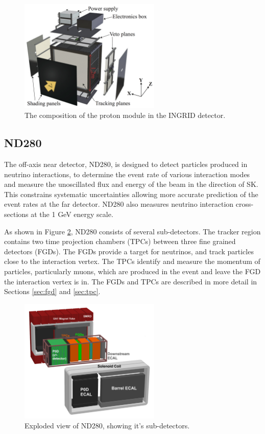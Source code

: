 \begin{figure}
\centering
\includegraphics*[width=0.6\textwidth,clip]{figs/protonmodule}
\caption{The composition of the proton module in the INGRID detector.} \label{protonmodule}
\end{figure}

\subsection{ND280}\label{sec:nd280}

The off-axis near detector, ND280, is designed to detect particles produced in neutrino interactions, to determine the event rate of various interaction modes and measure the unoscillated flux and energy of the beam in the direction of SK. This constrains systematic uncertainties allowing more accurate prediction of the event rates at the far detector. ND280 also measures neutrino interaction cross-sections at the 1 GeV energy scale. 

As shown in Figure \ref{nd280basket}, ND280 consists of several sub-detectors. The tracker region contains two time projection chambers (TPCs) between three fine grained detectors (FGDs). The FGDs provide a target for neutrinos, and track particles close to the interaction vertex. The TPCs identify and measure the momentum of particles, particularly muons, which are produced in the event and leave the FGD the interaction vertex is in. The FGDs and TPCs are described in more detail in Sections \ref{sec:fgd} and \ref{sec:tpc}.

\begin{figure}
\centering
\includegraphics*[width=0.6\textwidth,clip]{figs/nd280basket}
\caption{Exploded view of ND280, showing it's sub-detectors.} \label{nd280basket}
\end{figure}

